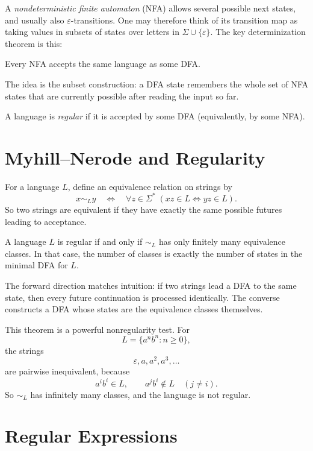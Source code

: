 A \emph{nondeterministic finite automaton} (NFA) allows several possible next states, and usually also $\varepsilon$-transitions. One may therefore think of its transition map as taking values in subsets of states over letters in $\Sigma \cup \{\varepsilon\}$. The key determinization theorem is this:

\begin{theorem}[NFA $=$ DFA, used as a black box]
Every NFA accepts the same language as some DFA.
\end{theorem}

The idea is the subset construction: a DFA state remembers the whole set of NFA states that are currently possible after reading the input so far.

\begin{definition}
A language is \emph{regular} if it is accepted by some DFA (equivalently, by some NFA).
\end{definition}

\section{Myhill--Nerode and Regularity}

For a language $L$, define an equivalence relation on strings by
\[
  x \sim_L y
  \quad\Longleftrightarrow\quad
  \forall z \in \Sigma^*\; (xz \in L \iff yz \in L).
\]
So two strings are equivalent if they have exactly the same possible futures leading to acceptance.

\begin{theorem}
A language $L$ is regular if and only if $\sim_L$ has only finitely many equivalence classes. In that case, the number of classes is exactly the number of states in the minimal DFA for $L$.
\end{theorem}

The forward direction matches intuition: if two strings lead a DFA to the same state, then every future continuation is processed identically. The converse constructs a DFA whose states are the equivalence classes themselves.

This theorem is a powerful nonregularity test. For
\[
  L = \{a^n b^n : n \ge 0\},
\]
the strings
\[
  \varepsilon, a, a^2, a^3, \dots
\]
are pairwise inequivalent, because
\[
  a^i b^i \in L,
  \qquad
  a^j b^i \notin L \quad (j \ne i).
\]
So $\sim_L$ has infinitely many classes, and the language is not regular.

\section{Regular Expressions}

